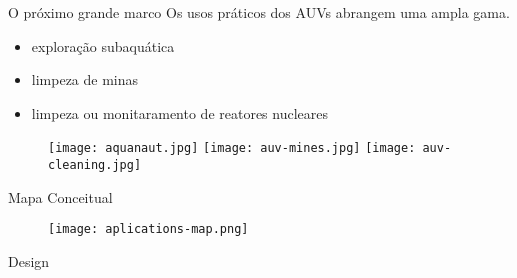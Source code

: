 






\begin{frame}[c]{O próximo grande marco}
    Os usos práticos dos AUVs abrangem uma ampla gama.
    \begin{itemize}
        \item exploração subaquática
        \item limpeza de minas
        \item limpeza ou monitaramento de reatores nucleares
    \end{itemize}

    \begin{figure}
        \texttt{[image: aquanaut.jpg]}
        \texttt{[image: auv-mines.jpg]}
        \texttt{[image: auv-cleaning.jpg]}
    \end{figure}
\end{frame}
\begin{frame}[c]{Mapa Conceitual}
        \begin{figure}
        \texttt{[image: aplications-map.png]}
    \end{figure}
\end{frame}
\begin{frame}[c]{Design}

\end{frame}
